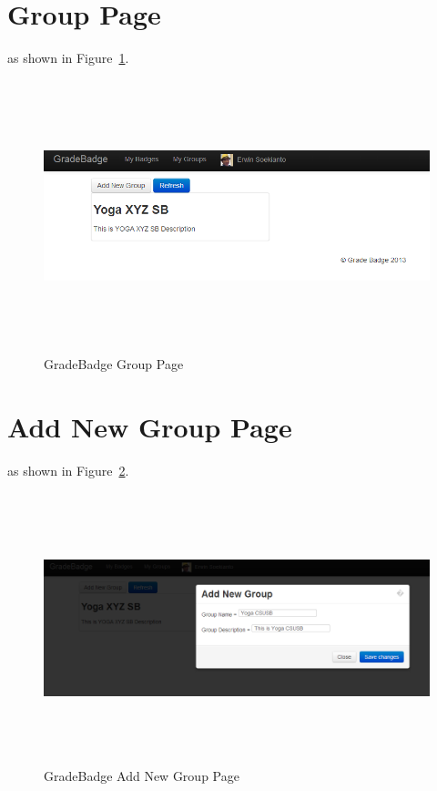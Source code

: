 \newpage
\section{Group Page}
 as shown in Figure~\ref{fig:group-page1}. 

\vspace{3em}
\begin{figure}[H]
\begin{center}
\includegraphics[height=3.1in,width=6.5in]{images/group-page1.png}
\caption{GradeBadge Group Page}
\label{fig:group-page1}
\end{center}
\end{figure}

\newpage
\section{Add New Group Page}
 as shown in Figure~\ref{fig:add-new-group}. 

\vspace{3em}
\begin{figure}[H]
\begin{center}
\includegraphics[height=3.1in,width=6.5in]{images/add-new-group.png}
\caption{GradeBadge Add New Group Page}
\label{fig:add-new-group}
\end{center}
\end{figure}

